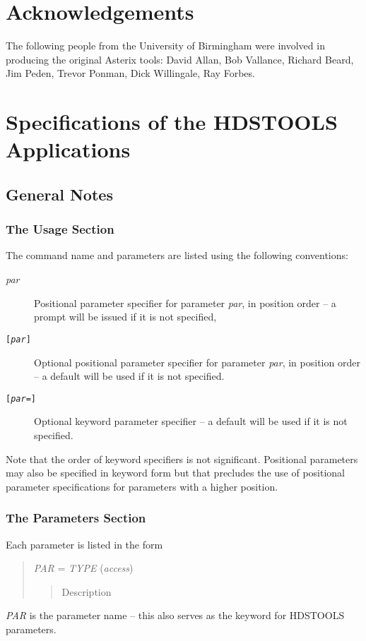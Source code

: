 \documentclass[twoside,11pt]{article}
\renewcommand{\_}{\texttt{\symbol{95}}}
\begin{document}
\section{Acknowledgements}
The following people from the University of Birmingham were involved in
producing the original Asterix tools: David Allan, Bob Vallance, Richard Beard,
Jim Peden, Trevor Ponman, Dick Willingale, Ray Forbes.

\section{Specifications of the HDSTOOLS Applications}
\subsection{General Notes}
\subsubsection{The Usage Section}
The command name and parameters are listed using the following conventions:
\begin{description}
\item[\textit{par}] Positional parameter specifier for parameter \textit{par},
in position order -- a prompt will be issued if it is not specified,
\item[\texttt{[\textit{par}]}] Optional positional parameter specifier for
parameter \textit{par}, in position order -- a default will be used if it is
not specified.
\item[\texttt{[\textit{par=}]}] Optional keyword parameter specifier -- a
default will be used if it is not specified.
\end{description}
Note that the order of keyword specifiers is not significant. Positional
parameters may also be specified in keyword form but that precludes the use of
positional parameter specifications for parameters with a higher position.

\subsubsection{The Parameters Section}
Each parameter is listed in the form
\begin{quote}
\textit{PAR} = \textit{TYPE} (\textit{access})
\begin{quote}
Description
\end{quote}
\end{quote}
\textit{PAR} is the parameter name -- this also serves as the keyword for
HDSTOOLS parameters.
\end{document}
